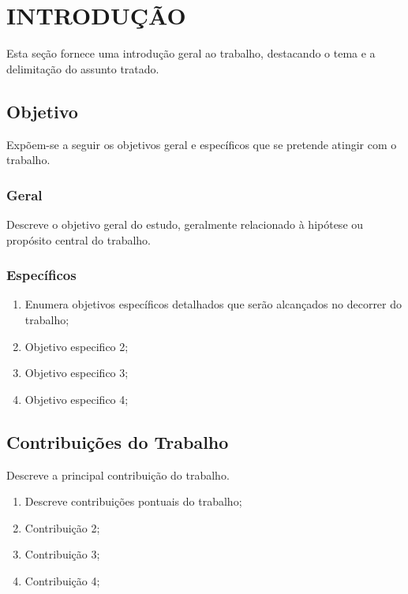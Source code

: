 \chapter{INTRODUÇÃO}\label{chp:INTRODUCAO} 
Esta seção fornece uma introdução geral ao trabalho, destacando o tema e a delimitação do assunto tratado.

\section{Objetivo}\label{sec:OBJETIVOS}

Expõem-se a seguir os objetivos geral e específicos que se pretende atingir com o trabalho.

\subsection{Geral}\label{sec:Geral}

Descreve o objetivo geral do estudo, geralmente relacionado à hipótese ou propósito central do trabalho.

\subsection{Específicos}\label{sec:Especificos}
\begin{enumerate}
    \item Enumera objetivos específicos detalhados que serão alcançados no decorrer do trabalho;
    
    \item Objetivo especifico 2;
    
    \item Objetivo especifico 3;
    
    \item Objetivo especifico 4;
\end{enumerate}


\section{Contribuições do Trabalho}\label{sec:CONTRIBUICOES}

Descreve a principal contribuição do trabalho.

\begin{enumerate}
    \item Descreve contribuições pontuais do trabalho;
    
    \item Contribuição 2;
    
    \item Contribuição 3;
    
    \item Contribuição 4;
\end{enumerate}

